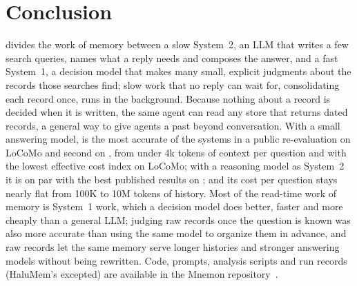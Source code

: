 \section{Conclusion}
\label{sec:conclusion}

\sys{} divides the work of memory between a slow System~2, an LLM that writes a few search queries, names what a reply needs and composes the answer, and a fast System~1, a decision model that makes many small, explicit judgments about the records those searches find; slow work that no reply can wait for, consolidating each record once, runs in the background.
Because nothing about a record is decided when it is written, the same agent can read any store that returns dated records, a general way to give agents a past beyond conversation.
With a small answering model, \sys{} is the most accurate of the systems in a public re-evaluation on LoCoMo and second on \lme, from under 4k tokens of context per question and with the lowest effective cost index on LoCoMo; with a reasoning model as System~2 it is on par with the best published results on \lme; and its cost per question stays nearly flat from 100K to 10M tokens of history.
Most of the read-time work of memory is System~1 work, which a decision model does better, faster and more cheaply than a general LLM; judging raw records once the question is known was also more accurate than using the same model to organize them in advance, and raw records let the same memory serve longer histories and stronger answering models without being rewritten.
Code, prompts, analysis scripts and run records (HaluMem's excepted) are available in the Mnemon repository~\citep{mnemon2026artifact}.
